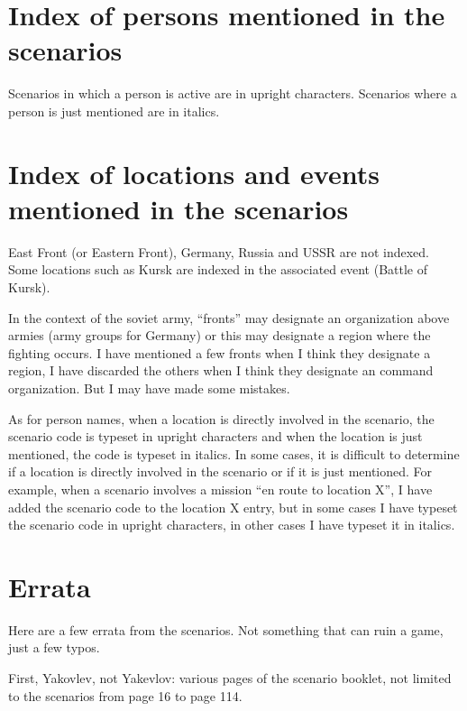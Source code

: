 \documentclass[a4paper,twocolumn]{article}
\begin{document}
\section*{Index of persons mentioned in the scenarios}

Scenarios in which a person is active are in upright characters.
Scenarios where a person is just mentioned are in italics.

\vspace{3mm}


\section*{Index of locations and events mentioned in the scenarios}

East Front (or Eastern Front), Germany, Russia and USSR are not
indexed. Some locations such as Kursk are indexed in the associated
event (Battle of Kursk).

\vspace{3mm}

In the context of the soviet army, ``fronts'' may designate an
organization above armies (army groups for Germany) or this may
designate a region where the fighting occurs. I have mentioned a few
fronts when I think they designate a region, I have discarded the
others when I think they designate an command organization.
But I may have made some mistakes.

\vspace{3mm}

As for person names, when a location is directly involved in the
scenario, the scenario code is typeset in upright characters and when
the location is just mentioned, the code is typeset in italics.
In some cases, it is difficult to determine if a location is directly
involved in the scenario or if it is just mentioned. For example, when
a scenario involves a mission ``en route to location X'', I have
added the scenario code to the location X entry, but in some cases I have
typeset the scenario code in upright characters, in other cases I have
typeset it in italics.

\vspace{3mm}


\section*{Errata}

Here are a few errata from the scenarios. Not something that can ruin a game, just
a few typos.

\vspace{3mm}

First, Yakovlev, not Yakevlov: various pages of the scenario booklet, not limited
to the scenarios from page 16 to page 114.

\vspace{3mm}

\end{document}
